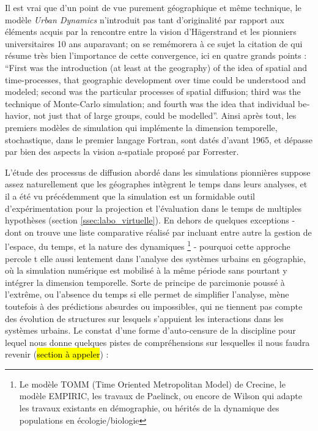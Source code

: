 Il est vrai que d'un point de vue purement géographique et même technique, le modèle \textit{Urban Dynamics} n'introduit pas tant d'originalité par rapport aux éléments acquis par la rencontre entre la vision d'Hägerstrand et les pionniers universitaires 10 ans auparavant; on se remémorera à ce sujet la citation de \textcite{Morril2005} qui résume très bien l'importance de cette convergence, ici en quatre grands points : \foreignquote{english}{First was the introduction (at least at the geography) of the idea of spatial and time-processes, that geographic development over time could be understood and modeled; second was the particular processes of spatial diffusion; third was the technique of Monte-Carlo simulation; and fourth was the idea that individual behavior, not just that of large groups, could be modelled}. Ainsi après tout, les premiers modèles de simulation qui implémente la dimension temporelle, stochastique, dans le premier langage Fortran, sont datés d'avant 1965, et dépasse par bien des aspects la vision a-spatiale proposé par Forrester.

L'étude des processus de diffusion abordé dans les simulations pionnières suppose assez naturellement que les géographes intègrent le temps dans leurs analyses, et il a été vu précédemment que la simulation est un formidable outil d'expérimentation pour la projection et l'évaluation dans le temps de multiples hypothèses (section \ref{ssec:labo_virtuelle}). En dehors de quelques exceptions - dont on trouve une liste comparative réalisé par \textcite{Batty1972} incluant entre autre la gestion de l'espace, du temps, et la nature des dynamiques \footnote{Le modèle TOMM (Time Oriented Metropolitan Model) de Crecine, le modèle EMPIRIC, les travaux de Paelinck, ou encore de Wilson qui adapte les travaux existants en démographie, ou hérités de la dynamique des populations en écologie/biologie} - pourquoi cette approche percole t elle aussi lentement dans l'analyse des systèmes urbains en géographie, où la simulation numérique est mobilisé à la même période sans pourtant y intégrer la dimension temporelle. Sorte de principe de parcimonie poussé à l'extrême, ou l'absence du temps si elle permet de simplifier l'analyse, mène toutefois à des prédictions absurdes ou impossibles, qui ne tiennent pas compte des évolution de structures sur lesquels s'appuient les interactions dans les systèmes urbains. Le constat d'une forme d'auto-censure de la discipline pour lequel \textcite[296-297]{Batty1976} nous donne quelques pistes de compréhensions sur lesquelles il nous faudra revenir (\hl{section à appeler}) :

